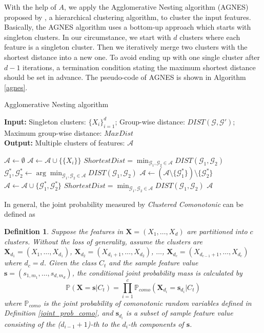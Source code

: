 \documentclass[twoside,11pt]{article}
\newtheorem{definition}{Definition}[subsection]
\begin{document}
With the help of $A$, we apply the Agglomerative Nesting algorithm (AGNES) proposed by \citet{kaufman1990finding}, a hierarchical clustering algorithm, to cluster the input features. Basically, the AGNES algorithm uses a bottom-up approach which starts with singleton clusters. In our circumstance, we start with $d$ clusters where each feature is a singleton cluster. Then we iteratively merge two clusters with the shortest distance into a new one. To avoid ending up with one single cluster after $d-1$ iterations, a termination condition stating the maximum shortest distance should be set in advance. The pseudo-code of AGNES is shown in Algorithm \ref{agnes}.

\begin{algorithm}
\caption{Agglomerative Nesting algorithm}\label{agnes}
\hspace*{\algorithmicindent}\textbf{Input:} Singleton clusters: $\{X_i\}_{i=1}^d$; Group-wise distance: $DIST(\mathcal{G},\mathcal{G'})$; Maximum group-wise distance: $MaxDist$ \\
\hspace*{\algorithmicindent}\textbf{Output:} Multiple clusters of features: $\mathcal{A}$ 
\begin{algorithmic}[1]
\State $\mathcal{A}\leftarrow\emptyset$
\State $\mathcal{A}\leftarrow\mathcal{A}\cup\{\{X_i\}\}$
\EndFor
\State $ShortestDist=\min_{\mathcal{G}_1,\mathcal{G}_2\in\mathcal{A}}DIST(\mathcal{G}_1,\mathcal{G}_2)$
\State $\mathcal{G}_1^{*},\mathcal{G}_2^{*}\leftarrow \arg\min_{\mathcal{G}_1,\mathcal{G}_2\in\mathcal{A}}DIST(\mathcal{G}_1,\mathcal{G}_2)$
\State $\mathcal{A}\leftarrow(\mathcal{A}\setminus\{\mathcal{G}_1^{*}\})\setminus\{\mathcal{G}_2^{*}\}$
\State $\mathcal{A}\leftarrow\mathcal{A}\cup\{\mathcal{G}_1^{*},\mathcal{G}_2^{*}\}$
\State $ShortestDist=\min_{\mathcal{G}_1,\mathcal{G}_2\in\mathcal{A}}DIST(\mathcal{G}_1,\mathcal{G}_2)$
\EndWhile
\State \Return $\mathcal{A}$
\end{algorithmic}
\end{algorithm}

In general, the joint probability measured by \textit{Clustered Comonotonic} can be defined as
\begin{definition}
Suppose the features in $\mathbf{X}=(X_1,\dots,X_d)$ are partitioned into $c$ clusters. Without the loss of generality, assume the clusters are $\mathbf{X}_{d_1}=(X_1,\dots,X_{d_1})$, $\mathbf{X}_{d_2}=(X_{d_1+1},\dots,X_{d_2})$, $\dots$, $\mathbf{X}_{d_c}=(X_{d_{c-1}+1},\dots,X_{d_{c}})$ where $d_c=d$. Given the class $C_t$ and the sample feature value $\mathbf{s}=(s_{1,m_1},\dots,s_{d,m_d})$, the conditional joint probability mass is calculated by
\begin{equation*}
    \mathbb{P}(\mathbf{X}=\mathbf{s}|C_t)=\prod_{i=1}^c \mathbb{P}_{como}(\mathbf{X}_{d_i}=\mathbf{s}_{d_i}|C_t)
\end{equation*}
where $\mathbb{P}_{como}$ is the joint probability of comonotonic random variables defined in Definition \ref{joint_prob_como}, and $\mathbf{s}_{d_i}$ is a subset of sample feature value consisting of the ($d_{i-1}+1$)-th to the $d_i$-th components of $\mathbf{s}$.
\end{definition}
\end{document}

